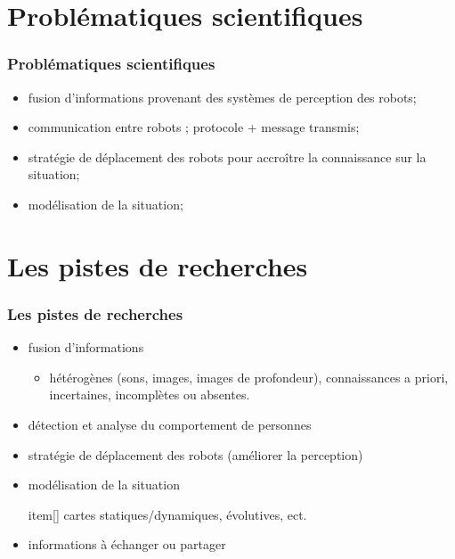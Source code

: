\documentclass[usepdftitle=false, xcolor=dvipsnames, 12, c]{beamer}
\begin{document}
\section{Problématiques scientifiques}
\begin{frame}[label=pbScientifiques]
\frametitle{Problématiques scientifiques}
\begin{itemize}
    \item fusion d'informations provenant des systèmes de perception des robots;
    \item communication entre robots ; protocole + message transmis;
    \item stratégie de déplacement des robots pour accroître la connaissance sur la situation;
    \item modélisation de la situation;
\end{itemize}
\end{frame}

\section{Les pistes de recherches}
\begin{frame}[label=pistesRecherches]
\frametitle{Les pistes de recherches}
    \begin{itemize}
        \item fusion d'informations 
        \begin{itemize}
            \item[] hétérogènes (sons, images, images de profondeur), connaissances a priori, incertaines, incomplètes ou absentes.
        \end{itemize}
        \item détection et analyse du comportement de personnes 
        \item stratégie de déplacement des robots (améliorer la perception)
        \item modélisation de la situation
        \begin{itemize}
            item[] cartes statiques/dynamiques, évolutives, ect.
        \end{itemize}
        \item informations à échanger ou partager
    \end{itemize}
\end{frame}
\end{document}
